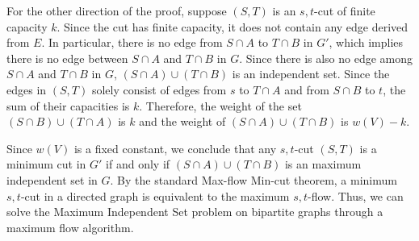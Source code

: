 \documentclass{bmcart}
\theoremstyle{mystyle}
\theoremstyle{proofstyle}
\begin{document}
For the other direction of the proof, suppose $(S,T)$ is an $s,t$-cut of finite capacity $k$. Since the cut has finite capacity, it does not contain any edge derived from $E$. In particular, there is no edge from $S \cap A$ to $T \cap B$ in $G'$, which implies there is no edge between $S\cap A$ and $T\cap B$ in $G$. Since there is also no edge among $S\cap A$ and $T\cap B$ in $G$, $(S\cap A) \cup (T \cap B)$ is an independent set. Since the edges in $(S,T)$ solely consist of edges from $s$ to $T \cap A$ and from $S \cap B$ to $t$, the sum of their capacities is $k$. Therefore, the weight of the set $(S \cap B) \cup (T \cap A)$ is $k$ and the weight of $(S\cap A) \cup (T \cap B)$ is $w(V)- k$.\smallskip

Since $w(V)$ is a fixed constant, we conclude that any $s,t$-cut $(S,T)$ is a minimum cut in $G'$ if and only if $(S\cap A) \cup (T \cap B)$ is an maximum independent set in $G$. By the standard Max-flow Min-cut theorem, a minimum $s,t$-cut in a directed graph is equivalent to the maximum $s,t$-flow. Thus, we can solve the Maximum Independent Set problem on bipartite graphs through a maximum flow algorithm.\smallskip
\end{document}
